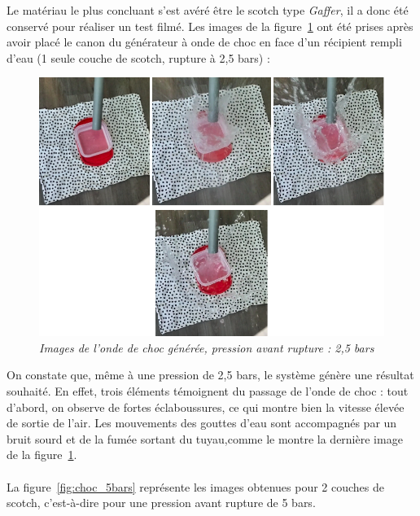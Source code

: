 Le matériau le plus concluant s’est avéré être le scotch type \textit{Gaffer}, il a donc été conservé pour réaliser un test filmé. Les images de la figure~\ref{fig:choc_filmee} ont été prises après avoir placé le canon du générateur à onde de choc en face d’un récipient rempli d’eau (1 seule couche de scotch, rupture à 2,5 bars) :\\
\begin{figure}[H]
	\centering
	\includegraphics[scale = 0.5]{figures/choc_filmee.png}
	\caption{\small{\textit{Images de l'onde de choc générée, pression avant rupture : 2,5 bars}}}
	\label{fig:choc_filmee}
\end{figure}
On constate que, même à une pression de 2,5 bars, le système génère une résultat souhaité. En effet, trois éléments témoignent du passage de l’onde de choc : tout d'abord, on observe de fortes éclaboussures, ce qui montre bien la vitesse élevée de sortie de l'air. Les mouvements des gouttes d'eau sont accompagnés par un bruit sourd et de la fumée sortant du tuyau,comme le montre la dernière image de la figure~\ref{fig:choc_filmee}.\\\\
La figure~\ref{fig:choc_5bars} représente les images obtenues pour 2 couches de scotch, c'est-à-dire pour une pression avant rupture de 5 bars.\\
